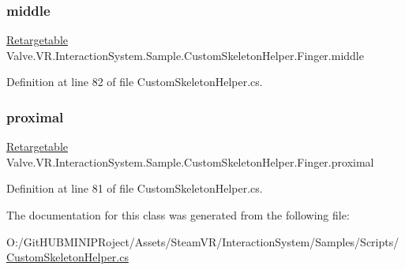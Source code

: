 \subsubsection{\texorpdfstring{middle}{middle}}
{\footnotesize\ttfamily \mbox{\hyperlink{class_valve_1_1_v_r_1_1_interaction_system_1_1_sample_1_1_custom_skeleton_helper_1_1_retargetable}{Retargetable}} Valve.\+V\+R.\+Interaction\+System.\+Sample.\+Custom\+Skeleton\+Helper.\+Finger.\+middle}



Definition at line 82 of file Custom\+Skeleton\+Helper.\+cs.

\mbox{\label{class_valve_1_1_v_r_1_1_interaction_system_1_1_sample_1_1_custom_skeleton_helper_1_1_finger_a2951dda098a33603116e361b6588cb19}} 
\subsubsection{\texorpdfstring{proximal}{proximal}}
{\footnotesize\ttfamily \mbox{\hyperlink{class_valve_1_1_v_r_1_1_interaction_system_1_1_sample_1_1_custom_skeleton_helper_1_1_retargetable}{Retargetable}} Valve.\+V\+R.\+Interaction\+System.\+Sample.\+Custom\+Skeleton\+Helper.\+Finger.\+proximal}



Definition at line 81 of file Custom\+Skeleton\+Helper.\+cs.



The documentation for this class was generated from the following file\+:\begin{DoxyCompactItemize}
\item 
O\+:/\+Git\+H\+U\+B\+M\+I\+N\+I\+P\+Roject/\+Assets/\+Steam\+V\+R/\+Interaction\+System/\+Samples/\+Scripts/\mbox{\hyperlink{_custom_skeleton_helper_8cs}{Custom\+Skeleton\+Helper.\+cs}}\end{DoxyCompactItemize}
